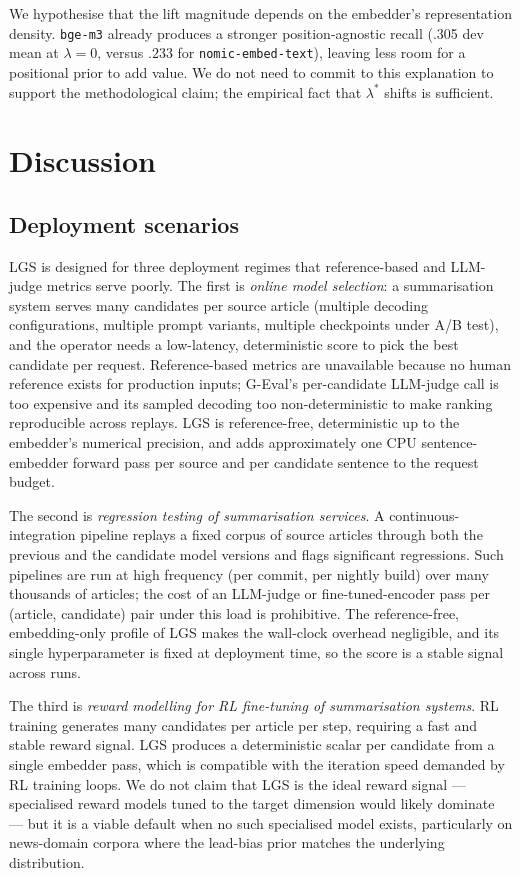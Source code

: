 \documentclass[journal]{IEEEtran}
\begin{document}
We hypothesise that the lift magnitude depends on the embedder's
representation density. \texttt{bge-m3} already produces a
stronger position-agnostic recall (.305 dev mean at $\lambda{=}0$,
versus $.233$ for \texttt{nomic-embed-text}), leaving less room
for a positional prior to add value. We do not need to commit to
this explanation to support the methodological claim; the
empirical fact that $\lambda^*$ shifts is sufficient.

\section{Discussion}
\label{sec:discussion}

\subsection{Deployment scenarios}
\label{sec:deployment}
LGS is designed for three deployment regimes that reference-based
and LLM-judge metrics serve poorly. The first is \emph{online
model selection}: a summarisation system serves many candidates
per source article (multiple decoding configurations, multiple
prompt variants, multiple checkpoints under A/B test), and the
operator needs a low-latency, deterministic score to pick the
best candidate per request. Reference-based metrics are
unavailable because no human reference exists for production
inputs; G-Eval's per-candidate LLM-judge call is too expensive
and its sampled decoding too non-deterministic to make ranking
reproducible across replays. LGS is reference-free, deterministic
up to the embedder's numerical precision, and adds approximately
one CPU sentence-embedder forward pass per source and per
candidate sentence to the request budget.

The second is \emph{regression testing of summarisation
services}. A continuous-integration pipeline replays a fixed
corpus of source articles through both the previous and the
candidate model versions and flags significant regressions. Such
pipelines are run at high frequency (per commit, per nightly
build) over many thousands of articles; the cost of an LLM-judge
or fine-tuned-encoder pass per (article, candidate) pair under
this load is prohibitive. The reference-free, embedding-only
profile of LGS makes the wall-clock overhead negligible, and
its single hyperparameter is fixed at deployment time, so the
score is a stable signal across runs.

The third is \emph{reward modelling for RL fine-tuning of
summarisation systems}. RL training generates many candidates
per article per step, requiring a fast and stable reward signal.
LGS produces a deterministic scalar per candidate from a single
embedder pass, which is compatible with the iteration speed
demanded by RL training loops. We do not claim that LGS is the
ideal reward signal --- specialised reward models tuned to the
target dimension would likely dominate --- but it is a viable
default when no such specialised model exists, particularly on
news-domain corpora where the lead-bias prior matches the
underlying distribution.
\end{document}
